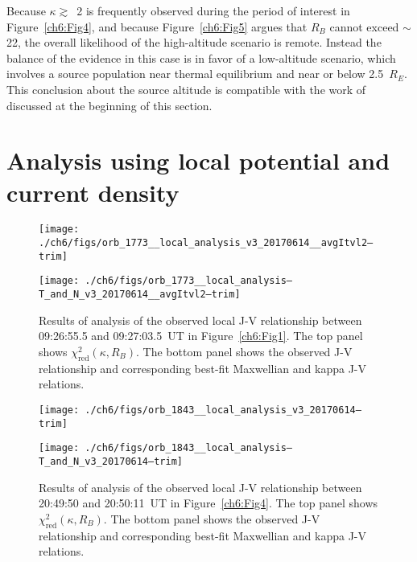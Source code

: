   Because $\kappa \gtrsim$~2 is frequently observed during the period of
  interest in Figure~\ref{ch6:Fig4}, and because Figure~\ref{ch6:Fig5} argues
  that $R_B$ cannot exceed $\sim$22, the overall likelihood of the high-altitude
  scenario is remote. Instead the balance of the evidence in this case is in
  favor of a low-altitude scenario, which involves a source population near
  thermal equilibrium and near or below 2.5~$R_E$. This conclusion about the
  source altitude is compatible with the work of \citet{Ergun1998} discussed at
  the beginning of this section.
  
  \section{Analysis using local potential and current density}


  \begin{figure}
    \centering
    \noindent\texttt{[image: ./ch6/figs/orb\_1773\_\_local\_analysis\_v3\_20170614\_\_avgItvl2--trim]}

    \vspace{1cm}

    \noindent\texttt{[image: ./ch6/figs/orb\_1773\_\_local\_analysis--T\_and\_N\_v3\_20170614\_\_avgItvl2--trim]}

    \caption[Orbit 1773: Reduced chi-squared values for local J-V relationship and
    corresponding best-fit curves.]{Results of analysis of the observed local
      J-V relationship between 09:26:55.5 and 09:27:03.5~UT in
      Figure~\ref{ch6:Fig1}. The top panel shows
      $\chi^2_{\mathrm{red}} ( \kappa, R_B)$. The bottom panel shows the
      observed J-V relationship and corresponding best-fit Maxwellian and kappa
      J-V relations.}
    \label{ch6:Fig7}
  \end{figure}

  

  \begin{figure}
    \centering

    \noindent\texttt{[image: ./ch6/figs/orb\_1843\_\_local\_analysis\_v3\_20170614--trim]}

    \vspace{1cm}

    \noindent\texttt{[image: ./ch6/figs/orb\_1843\_\_local\_analysis--T\_and\_N\_v3\_20170614--trim]}

    \caption[Orbit 1843: Reduced chi-squared values for local J-V relationship
    and corresponding best-fit curves.]{Results of analysis of the observed
      local J-V relationship between 20:49:50 and 20:50:11~UT in
      Figure~\ref{ch6:Fig4}. The top panel shows
      $\chi^2_{\mathrm{red}} ( \kappa, R_B)$. The bottom panel shows the
      observed J-V relationship and corresponding best-fit Maxwellian and kappa
      J-V relations.}
    \label{ch6:Fig8}
  \end{figure}

